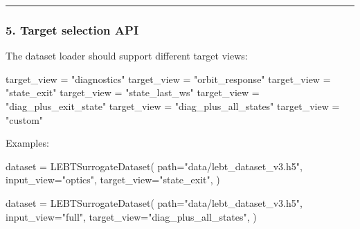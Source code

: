 \documentclass[
]{article}
\newenvironment{Shaded}{}{}
\newcommand{\NormalTok}[1]{#1}
\newcommand{\OperatorTok}[1]{\textcolor[rgb]{0.40,0.40,0.40}{#1}}
\newcommand{\StringTok}[1]{\textcolor[rgb]{0.25,0.44,0.63}{#1}}
\begin{document}
\begin{center}\rule{0.5\linewidth}{0.5pt}\end{center}

\hypertarget{target-selection-api}{%
\subsubsection{5. Target selection API}\label{target-selection-api}}

The dataset loader should support different target views:

\begin{Shaded}
\begin{Highlighting}[]
\NormalTok{target\_view }\OperatorTok{=} \StringTok{"diagnostics"}
\NormalTok{target\_view }\OperatorTok{=} \StringTok{"orbit\_response"}
\NormalTok{target\_view }\OperatorTok{=} \StringTok{"state\_exit"}
\NormalTok{target\_view }\OperatorTok{=} \StringTok{"state\_last\_ws"}
\NormalTok{target\_view }\OperatorTok{=} \StringTok{"diag\_plus\_exit\_state"}
\NormalTok{target\_view }\OperatorTok{=} \StringTok{"diag\_plus\_all\_states"}
\NormalTok{target\_view }\OperatorTok{=} \StringTok{"custom"}
\end{Highlighting}
\end{Shaded}

Examples:

\begin{Shaded}
\begin{Highlighting}[]
\NormalTok{dataset }\OperatorTok{=}\NormalTok{ LEBTSurrogateDataset(}
\NormalTok{    path}\OperatorTok{=}\StringTok{"data/lebt\_dataset\_v3.h5"}\NormalTok{,}
\NormalTok{    input\_view}\OperatorTok{=}\StringTok{"optics"}\NormalTok{,}
\NormalTok{    target\_view}\OperatorTok{=}\StringTok{"state\_exit"}\NormalTok{,}
\NormalTok{)}
\end{Highlighting}
\end{Shaded}

\begin{Shaded}
\begin{Highlighting}[]
\NormalTok{dataset }\OperatorTok{=}\NormalTok{ LEBTSurrogateDataset(}
\NormalTok{    path}\OperatorTok{=}\StringTok{"data/lebt\_dataset\_v3.h5"}\NormalTok{,}
\NormalTok{    input\_view}\OperatorTok{=}\StringTok{"full"}\NormalTok{,}
\NormalTok{    target\_view}\OperatorTok{=}\StringTok{"diag\_plus\_all\_states"}\NormalTok{,}
\NormalTok{)}
\end{Highlighting}
\end{Shaded}
\end{document}
